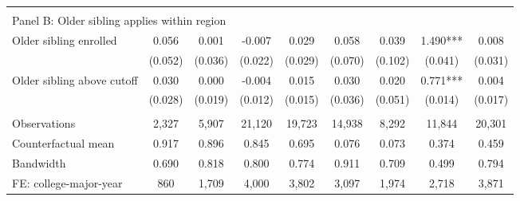 {{\begin{tabular}{lcccccccc}
&  &  &  & & & & & &    \\
\multicolumn{9}{l}{Panel B: Older sibling applies within region} \\
Older sibling enrolled&       0.056   &       0.001   &      -0.007   &       0.029   &       0.058   &       0.039   &       1.490***&       0.008   \\
                    &     (0.052)   &     (0.036)   &     (0.022)   &     (0.029)   &     (0.070)   &     (0.102)   &     (0.041)   &     (0.031)   \\
 
Older sibling above cutoff&       0.030   &       0.000   &      -0.004   &       0.015   &       0.030   &       0.020   &       0.771***&       0.004   \\
                    &     (0.028)   &     (0.019)   &     (0.012)   &     (0.015)   &     (0.036)   &     (0.051)   &     (0.014)   &     (0.017)   \\
                    &               &               &               &               &               &               &               &               \\
Observations        &       2,327   &       5,907   &      21,120   &      19,723   &      14,938   &       8,292   &      11,844   &      20,301   \\
Counterfactual mean &       0.917   &       0.896   &       0.845   &       0.695   &       0.076   &       0.073   &       0.374   &       0.459   \\
Bandwidth           &       0.690   &       0.818   &       0.800   &       0.774   &       0.911   &       0.709   &       0.499   &       0.794   \\
FE: college-major-year&         860   &       1,709   &       4,000   &       3,802   &       3,097   &       1,974   &       2,718   &       3,871   \\
 

\bottomrule
\end{tabular}
}
}
